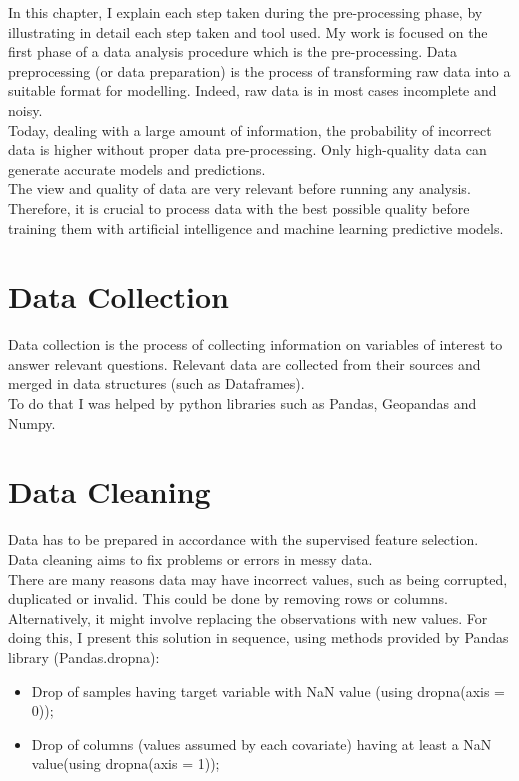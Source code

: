 In this chapter, I explain each step taken during the pre-processing phase, by illustrating in detail each step taken and tool used.
My work is focused on the first phase of a data analysis procedure which is the pre-processing.
Data preprocessing (or data preparation) is the process of transforming raw data into a suitable format for modelling. 
Indeed, raw data is in most cases incomplete and noisy.\\
Today, dealing with a large amount of information, the probability of incorrect data is higher without proper data pre-processing.
Only high-quality data can generate accurate models and predictions. \\
The view and quality of data are very relevant before running any analysis.\\
Therefore, it is crucial to process data with the best possible quality before training them with artificial intelligence and machine learning predictive models.\par

\section{Data Collection}
Data collection is the process of collecting information on variables of interest to answer relevant questions. \newline
Relevant data are collected from their sources and merged in data structures (such as Dataframes). \\
To do that I was helped by python libraries such as Pandas, Geopandas and Numpy.
\section{Data Cleaning}
\label{sec:Data cleaning}
Data has to be prepared in accordance with the supervised feature selection.
Data cleaning aims to fix problems or errors in messy data.\\ There are many reasons data may have incorrect values, such as being corrupted, duplicated or invalid. \newline
This could be done by removing rows or columns. Alternatively, it might involve replacing the observations with new values. \newline
For doing this, I present this solution in sequence, using methods provided by Pandas library (Pandas.dropna):
\begin{itemize}
\item Drop of samples having target variable with NaN value (using dropna(axis = 0));
\item Drop of columns (values assumed by each covariate) having at least a NaN value(using dropna(axis = 1));
\end{itemize}
